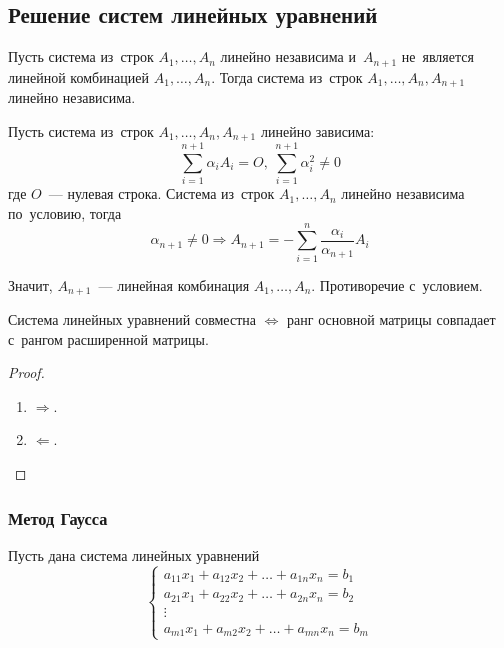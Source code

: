 \subsection{Решение систем линейных уравнений}
\begin{lemma}
Пусть система из~строк $A_1, \ldots, A_n$ линейно независима и~$A_{n+1}$ не~является линейной комбинацией $A_1, \ldots, A_n$. Тогда система из~строк $A_1, \ldots, A_n, A_{n+1}$ линейно независима.
\end{lemma}
\begin{proofcontra}
Пусть система из~строк $A_1, \ldots, A_n, A_{n+1}$ линейно зависима:
\begin{equation*}
\sum_{i=1}^{n+1} \alpha_i A_i = O, \ 
\sum_{i=1}^{n+1} \alpha_i^2 \neq 0
\end{equation*}
где $O$~--- нулевая строка.
Система из~строк $A_1, \ldots, A_n$ линейно независима по~условию, тогда
\begin{equation*}
\alpha_{n+1} \neq 0 \Rightarrow A_{n+1} = -\sum_{i=1}^n \frac{\alpha_i}{\alpha_{n+1}} A_i
\end{equation*}

Значит, $A_{n+1}$~--- линейная комбинация $A_1, \ldots, A_n$.
Противоречие с~условием.
\end{proofcontra}

\begin{theorem}
Система линейных уравнений совместна $\Leftrightarrow$ ранг основной матрицы совпадает с~рангом расширенной матрицы.
\end{theorem}
\begin{proof}
\begin{enumerate}
	\item $\Rightarrow$. 
	\item $\Leftarrow$.
\end{enumerate}
\end{proof}

\subsubsection{Метод Гаусса}
Пусть дана система линейных уравнений
\begin{equation}
\label{eq:Gaussian_elimination(1)}
\begin{cases}
a_{11}x_1 + a_{12}x_2 + \dots + a_{1n}x_n = b_1 \\
a_{21}x_1 + a_{22}x_2 + \dots + a_{2n}x_n = b_2 \\
\vdots \\
a_{m1}x_1 + a_{m2}x_2 + \dots + a_{mn}x_n = b_m
\end{cases}
\end{equation}

